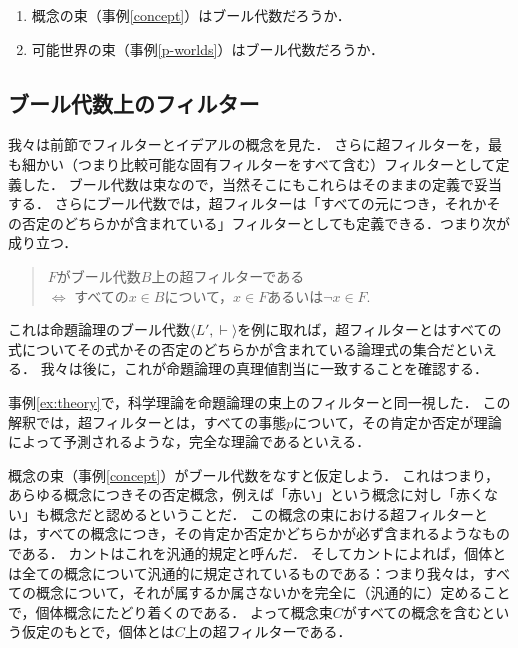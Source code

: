 \documentclass[11pt,a4paper, dvipdfmx]{jsarticle}
\begin{document}
\begin{exercise}
    \begin{enumerate}
        \item 概念の束（事例\ref{concept}）はブール代数だろうか．
        \item 可能世界の束（事例\ref{p-worlds}）はブール代数だろうか．
    \end{enumerate}
\end{exercise}



\subsection{ブール代数上のフィルター}

我々は前節でフィルターとイデアルの概念を見た．
さらに超フィルターを，最も細かい（つまり比較可能な固有フィルターをすべて含む）フィルターとして定義した．
ブール代数は束なので，当然そこにもこれらはそのままの定義で妥当する．
さらにブール代数では，超フィルターは「すべての元につき，それかその否定のどちらかが含まれている」フィルターとしても定義できる．つまり次が成り立つ．
\begin{fact}
    \begin{quote}
        $F$がブール代数$B$上の超フィルターである 
        \\ $\iff$ すべての$x \in B$について，$x \in F$あるいは$\neg x \in F$.    
    \end{quote}
\end{fact}

これは命題論理のブール代数$\langle L', \vdash \rangle$を例に取れば，超フィルターとはすべての式についてその式かその否定のどちらかが含まれている論理式の集合だといえる．
我々は後に，これが命題論理の真理値割当に一致することを確認する．

\begin{example}[完全な理論]
事例\ref{ex:theory}で，科学理論を命題論理の束上のフィルターと同一視した．
この解釈では，超フィルターとは，すべての事態$p$について，その肯定か否定が理論によって予測されるような，完全な理論であるといえる．
\end{example}    

\begin{example}[汎通的規定]
概念の束（事例\ref{concept}）がブール代数をなすと仮定しよう．
これはつまり，あらゆる概念につきその否定概念，例えば「赤い」という概念に対し「赤くない」も概念だと認めるということだ．
この概念の束における超フィルターとは，すべての概念につき，その肯定か否定かどちらかが必ず含まれるようなものである．
カントはこれを汎通的規定と呼んだ．
そしてカントによれば，個体とは全ての概念について汎通的に規定されているものである：つまり我々は，すべての概念について，それが属するか属さないかを完全に（汎通的に）定めることで，個体概念にたどり着くのである．
よって概念束$C$がすべての概念を含むという仮定のもとで，個体とは$C$上の超フィルターである．
\end{example}
\end{document}
